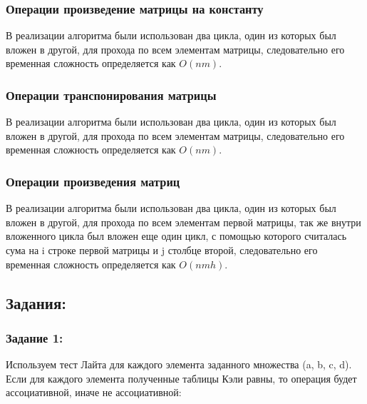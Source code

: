 \documentclass[spec, och, labwork]{shiza}
\begin{document}
    \subsubsection{Операции произведение матрицы на константу}
            В реализации алгоритма были использован два цикла, один из которых был вложен в другой, для прохода по всем элементам матрицы, следовательно его временная сложность определяется как $O(nm)$.

    \subsubsection{Операции транспонирования матрицы}
            В реализации алгоритма были использован два цикла, один из которых был вложен в другой, для прохода по всем элементам матрицы, следовательно его временная сложность определяется как $O(nm)$.

    \subsubsection{Операции произведения матриц}
            В реализации алгоритма были использован два цикла, один из которых был вложен в другой, для прохода по всем элементам первой матрицы, так же внутри вложенного цикла был вложен еще один цикл, 
            с помощью которого считалась сума на i строке первой матрицы и j столбце второй, следовательно его временная сложность определяется как $O(nmh)$.

\subsection{Задания:}

\subsubsection{Задание 1:}
Используем тест Лайта для каждого элемента заданного множества (a, b, c, d). Если для каждого элемента полученные таблицы
Кэли равны, то операция будет ассоциативной, иначе не ассоциативной:
\end{document}
